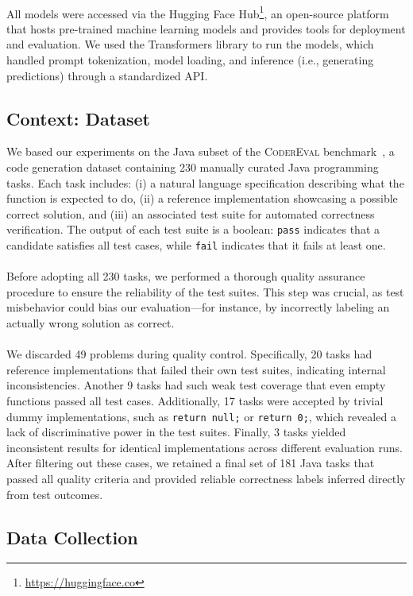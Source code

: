 \documentclass[a4paper]{usiinfbachelorproject}
\begin{document}
\\[2pt]
All models were accessed via the Hugging Face Hub\footnote{\url{https://huggingface.co}}, an open-source platform that hosts pre-trained machine learning models and provides tools for deployment and evaluation. We used the Transformers library to run the models, which handled prompt tokenization, model loading, and inference (i.e., generating predictions) through a standardized API.

\subsection{Context: Dataset}\label{sec:dataset}
We based our experiments on the Java subset of the \textsc{CoderEval} benchmark~\cite{coderEval2023}, a code generation dataset containing 230 manually curated Java programming tasks. Each task includes: (i) a natural language specification describing what the function is expected to do, (ii) a reference implementation showcasing a possible correct solution, and (iii) an associated test suite for automated correctness verification. The output of each test suite is a boolean: \texttt{pass} indicates that a candidate satisfies all test cases, while \texttt{fail} indicates that it fails at least one.\\
\\[2pt]
Before adopting all 230 tasks, we performed a thorough quality assurance procedure to ensure the reliability of the test suites. This step was crucial, as test misbehavior could bias our evaluation—for instance, by incorrectly labeling an actually wrong solution as correct.\\
\\[2pt]
We discarded 49 problems during quality control. Specifically, 20 tasks had reference implementations that failed their own test suites, indicating internal inconsistencies. Another 9 tasks had such weak test coverage that even empty functions passed all test cases. Additionally, 17 tasks were accepted by trivial dummy implementations, such as \texttt{return null;} or \texttt{return 0;}, which revealed a lack of discriminative power in the test suites. Finally, 3 tasks yielded inconsistent results for identical implementations across different evaluation runs. After filtering out these cases, we retained a final set of 181 Java tasks that passed all quality criteria and provided reliable correctness labels inferred directly from test outcomes.

\subsection{Data Collection}\label{sec:collection}
\end{document}
